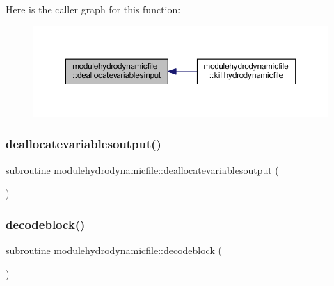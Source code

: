 Here is the caller graph for this function\+:\nopagebreak
\begin{figure}[H]
\begin{center}
\leavevmode
\includegraphics[width=350pt]{namespacemodulehydrodynamicfile_a44ff390b68de3bb94294a2fe2d251814_icgraph}
\end{center}
\end{figure}
\mbox{\label{namespacemodulehydrodynamicfile_aa952fb593bad5ccc173888f38e59a6f8}} 
\subsubsection{\texorpdfstring{deallocatevariablesoutput()}{deallocatevariablesoutput()}}
{\footnotesize\ttfamily subroutine modulehydrodynamicfile\+::deallocatevariablesoutput (\begin{DoxyParamCaption}{ }\end{DoxyParamCaption})\hspace{0.3cm}{\ttfamily [private]}}

\mbox{\label{namespacemodulehydrodynamicfile_ae7f1a97acd1cc5b22e6ff9e638243e70}} 
\subsubsection{\texorpdfstring{decodeblock()}{decodeblock()}}
{\footnotesize\ttfamily subroutine modulehydrodynamicfile\+::decodeblock (\begin{DoxyParamCaption}{ }\end{DoxyParamCaption})\hspace{0.3cm}{\ttfamily [private]}}

